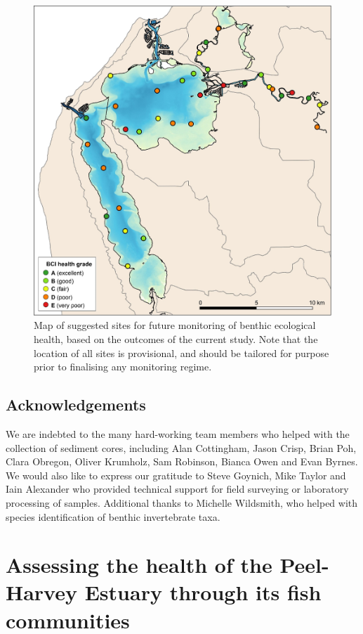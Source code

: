 \documentclass[
]{book}
\begin{document}
\begin{figure}
\includegraphics[width=1\linewidth]{images/BMI/picture17} \caption{Map of suggested sites for future monitoring of benthic ecological health, based on the outcomes of the current study. Note that the location of all sites is provisional, and should be tailored for purpose prior to finalising any monitoring regime. }\label{fig:BMI-pic17}
\end{figure}

\hypertarget{acknowledgements}{%
\section{Acknowledgements}\label{acknowledgements}}

We are indebted to the many hard-working team members who helped with the collection of sediment cores, including Alan Cottingham, Jason Crisp, Brian Poh, Clara Obregon, Oliver Krumholz, Sam Robinson, Bianca Owen and Evan Byrnes. We would also like to express our gratitude to Steve Goynich, Mike Taylor and Iain Alexander who provided technical support for field surveying or laboratory processing of samples. Additional thanks to Michelle Wildsmith, who helped with species identification of benthic invertebrate taxa.

\hypertarget{assessing-the-health-of-the-peel-harvey-estuary-through-its-fish-communities}{%
\chapter{Assessing the health of the Peel-Harvey Estuary through its fish communities}\label{assessing-the-health-of-the-peel-harvey-estuary-through-its-fish-communities}}
\end{document}
